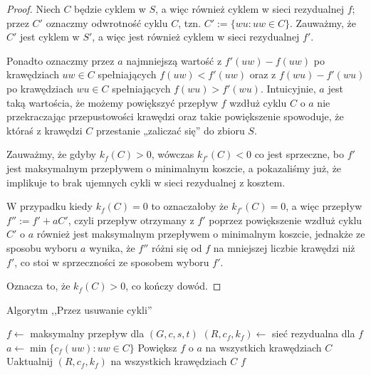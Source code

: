 \begin{theorem}
\begin{proof}
		Niech $C$ będzie cyklem w $S$, a więc również 
		cyklem w sieci rezydualnej $f$; przez $C'$ oznaczmy
		odwrotność cyklu $C$, tzn. $C' := \{wu : uw \in C\}$.
		Zauważmy, że $C'$ jest cyklem w $S'$, a więc jest
		również cyklem w sieci rezydualnej $f'$. 
		
		Ponadto oznaczmy
		przez $a$ najmniejszą wartość z $f'(uw) - f(uw)$ po krawędziach
		$uw \in C$ spełniających $f(uw) < f'(uw)$ oraz z 
		$f(wu) - f'(wu)$ po krawędziach $wu \in C$ spełniających
		$f(wu) > f'(wu)$. Intuicyjnie, $a$ jest taką wartościa, 
		że
		możemy powiększyć przepływ $f$ wzdłuż cyklu $C$ o $a$ 
		nie przekraczając przepustowości krawędzi oraz 
		takie powiększenie
		spowoduje, że któraś z krawędzi $C$ przestanie 
		„zaliczać się” do zbioru $S$.
		
		Zauważmy, że gdyby $k_f(C) > 0$, wówczas $k_{f'}(C) < 0$
		co jest sprzeczne, bo $f'$ jest maksymalnym
		przepływem o minimalnym koszcie, a  pokazaliśmy już,
		że  implikuje to brak ujemnych cykli
		w sieci rezydualnej z kosztem.
		
		W przypadku kiedy $k_f(C) = 0$ to oznaczałoby że $k_{f'}(C)=0$,
		a więc przepływ $f'' := f' + aC'$, czyli przepływ otrzymany
		z $f'$ poprzez powiększenie wzdłuż cyklu $C'$ o $a$ również 
		jest maksymalnym przepływem o minimalnym koszcie, jednakże
		ze sposobu wyboru $a$ wynika, że $f''$ różni się od $f$
		na mniejszej liczbie krawędzi niż $f'$, co stoi w 
		sprzeczności ze sposobem wyboru $f'$.
		
		Oznacza to, że $k_f(C) > 0$, co kończy dowód. \qedhere
		
	\end{proof}
	\label{thrm:mincostmaxflow}
\end{theorem}

\begin{algorithm}[H]
	\caption{Algorytm ,,Przez usuwanie cykli''}
	\begin{algorithmic}[1]
		\State $f \gets $ maksymalny przepływ dla $(G,c,s,t)$
		\State $(R,c_f,k_f) \gets $ sieć rezydualna dla $f$
		\State $a \gets \min\{c_f(uw) : uw \in C\}$
		\State Powiększ $f$ o $a$ na wszystkich krawędziach $C$
		\State Uaktualnij $(R, c_f, k_f)$ na wszystkich krawędziach $C$
		\EndWhile 
		\State \Return $f$
		\EndProcedure
	\end{algorithmic}
	\label{alg:cyclecancel}
\end{algorithm}
